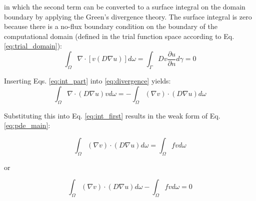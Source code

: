 \documentclass[12pt,a4paper]{article}
\begin{document}
\noindent in which the second term can be converted to a surface integral on the domain boundary by applying the Green's divergence theory. The surface integral is zero because there is a no-flux boundary condition on the boundary of the computational domain (defined in the trial function space according to Eq. \ref{eq:trial_domain}):
\begin{equation} \label{eq:divergence}
\int_{\Omega} \nabla \cdot[v(D \nabla u)] d \omega = \int_{\Gamma} D v \frac{\partial u}{\partial n} d \gamma=0
\end{equation}

\noindent Inserting Eqs. \ref{eq:int_part} into \ref{eq:divergence}  yields:
\begin{equation}
\int_{\Omega} \nabla \cdot (D  \nabla u) v d \omega = -\int_{\Omega} (\nabla v) \cdot(D \nabla u) d \omega
\end{equation}

\noindent Substituting this into Eq. \ref{eq:int_first} results in the weak form of Eq. \ref{eq:pde_main}:

\begin{equation}  \label{eq:weak_general}
\int_{\Omega} (\nabla v) \cdot(D \nabla u) d \omega=\int_{\Omega} f v d \omega
\end{equation}

\noindent or

\begin{equation}  \label{eq:weak_general}
\int_{\Omega} (\nabla v) \cdot(D \nabla u) d \omega-\int_{\Omega} f v d \omega=0
\end{equation}
\end{document}

